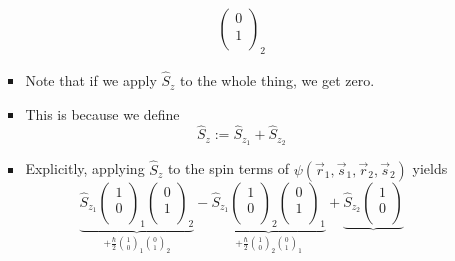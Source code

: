 \documentclass[../notes.tex]{subfiles}
\begin{document}
\begin{itemize}
\begin{itemize}
\begin{itemize}
\begin{align*}
\begin{pmatrix}
                    0\\
                    1\\
                \end{pmatrix}_2
            \end{align*}
            \item Note that if we apply $\hat{S}_z$ to the whole thing, we get zero.
            \item This is because we define
            \begin{equation*}
                \hat{S}_z := \hat{S}_{z_1}+\hat{S}_{z_2}
            \end{equation*}
            \item Explicitly, applying $\hat{S}_z$ to the spin terms of $\psi(\vec{r}_1,\vec{s}_1,\vec{r}_2,\vec{s}_2)$ yields
            \begin{equation*}
                \underbrace{
                    \hat{S}_{z_1}
                    \begin{pmatrix}
                        1\\
                        0\\
                    \end{pmatrix}_1
                    \begin{pmatrix}
                        0\\
                        1\\
                    \end{pmatrix}_2
                }_{
                    +\frac{\hbar}{2}\binom{1}{0}_1\binom{0}{1}_2
                }-\underbrace{
                    \hat{S}_{z_1}
                    \begin{pmatrix}
                        1\\
                        0\\
                    \end{pmatrix}_2
                    \begin{pmatrix}
                        0\\
                        1\\
                    \end{pmatrix}_1
                }_{
                    +\frac{\hbar}{2}\binom{1}{0}_2\binom{0}{1}_1
                }+\underbrace{
                    \hat{S}_{z_2}
                    \begin{pmatrix}
                        1\\
                        0\\

\end{pmatrix}}
\end{equation*}
\end{itemize}
\end{itemize}
\end{itemize}
\end{document}
